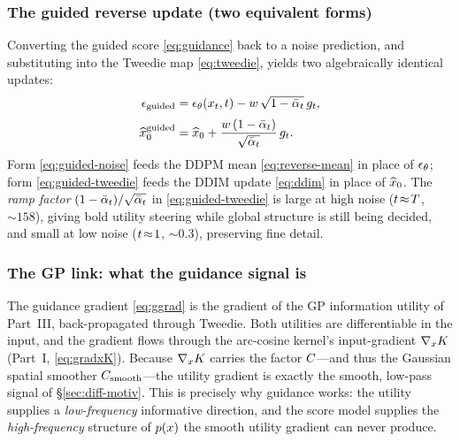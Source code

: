 \subsubsection{The guided reverse update (two equivalent forms)}
Converting the guided score \eqref{eq:guidance} back to a noise prediction, and
substituting into the Tweedie map \eqref{eq:tweedie}, yields two algebraically
identical updates:
\begin{align}
\epsilon_{\mathrm{guided}} &= \epsilon_{\theta}(x_{t},t)-w\,\sqrt{1-\bar{\alpha}_{t}}\,g_{t},
   \label{eq:guided-noise}\\[2pt]
\widehat{x}_{0}^{\mathrm{guided}} &= \widehat{x}_{0}+\frac{w\,(1-\bar{\alpha}_{t})}{\sqrt{\bar{\alpha}_{t}}}\,g_{t}.
   \label{eq:guided-tweedie}
\end{align}
Form \eqref{eq:guided-noise} feeds the DDPM mean \eqref{eq:reverse-mean} in place
of $\epsilon_{\theta}$; form \eqref{eq:guided-tweedie} feeds the DDIM update \eqref{eq:ddim}
in place of $\widehat{x}_{0}$. The \emph{ramp factor} $(1-\bar{\alpha}_{t})/\sqrt{\bar{\alpha}_{t}}$ in
\eqref{eq:guided-tweedie} is large at high noise ($t\!\approx\!T$, $\sim\!158$),
giving bold utility steering while global structure is still being decided, and
small at low noise ($t\!\approx\!1$, $\sim\!0.3$), preserving fine detail.

\subsubsection{The GP link: what the guidance signal is}\label{sec:diff-gplink}
The guidance gradient \eqref{eq:ggrad} is the gradient of the GP information
utility of Part~III, back-propagated through Tweedie. Both utilities are
differentiable in the input, and the gradient flows through the arc-cosine
kernel's input-gradient $\nabla_{x}K$ (Part~I, \eqref{eq:gradxK}). Because
$\nabla_{x}K$ carries the factor $C$---and thus the Gaussian spatial
smoother $C_{\mathrm{smooth}}$---the utility gradient is exactly the smooth, low-pass signal of
\S\ref{sec:diff-motiv}. This is precisely why guidance works: the utility supplies
a \emph{low-frequency} informative direction, and the score model supplies the
\emph{high-frequency} structure of $p(x)$ the smooth utility gradient can never
produce.

